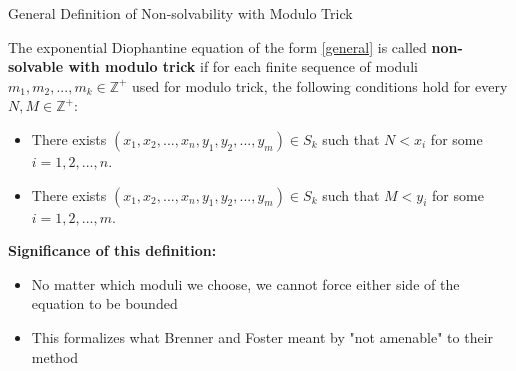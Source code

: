 \begin{frame}{General Definition of Non-solvability with Modulo Trick}
    \begin{definition}
        The exponential Diophantine equation of the form \eqref{general} is called \textbf{non-solvable with modulo trick} if for each finite sequence of moduli $m_1, m_2, ..., m_k \in \mathbb{Z}^{+}$ used for modulo trick, the following conditions hold for every $N, M \in \mathbb{Z}^{+}$:
        
        \begin{itemize}
            \item There exists $(x_1, x_2, ..., x_n, y_1, y_2, ..., y_m) \in S_k$ such that $N < x_i$ for some $i = 1,2,...,n$.
            
            \item There exists $(x_1, x_2, ..., x_n, y_1, y_2, ..., y_m) \in S_k$ such that $M < y_i$ for some $i = 1,2,...,m$.
        \end{itemize}
    \end{definition}
    
    \textbf{Significance of this definition:}
    \begin{itemize}
        \item No matter which moduli we choose, we cannot force either side of the equation to be bounded
       
        \item This formalizes what Brenner and Foster meant by "not amenable" to their method
    \end{itemize}
\end{frame}


